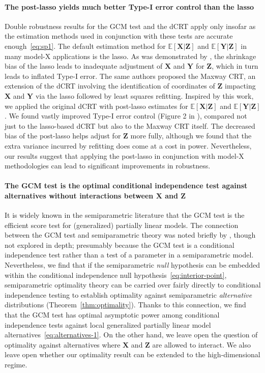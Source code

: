 \documentclass[aos]{imsart}
\theoremstyle{plain}
\theoremstyle{remark}
\newcommand{\E}{\mathbb E}								%
\newcommand{\prx}{\bm X}								%
\newcommand{\prz}{\bm Z}								%
\newcommand{\pry}{{\bm Y}}								%
\begin{document}
\paragraph*{The post-lasso yields much better Type-I error control than the lasso}

Double robustness results for the GCM test and the dCRT apply only insofar as the estimation methods used in conjunction with these tests are accurate enough~\eqref{eq:sp1}. The default estimation method for $\E[\prx|\prz]$ and $\E[\pry|\prz]$ in many model-X applications is the lasso. As was demonstrated by \cite{Li2022}, the shrinkage bias of the lasso leads to inadequate adjustment of $\prx$ and $\pry$ for $\prz$, which in turn leads to inflated Type-I error. The same authors proposed the Maxway CRT, an extension of the dCRT involving the identification of coordinates of $\prz$ impacting $\prx$ and $\pry$ via the lasso followed by least squares refitting. Inspired by this work, we applied the original dCRT with post-lasso estimates for $\E[\prx|\prz]$ and $\E[\pry|\prz]$. We found vastly improved Type-I error control (Figure 2 in \cite{supplementary}), compared not just to the lasso-based dCRT but also to the Maxway CRT itself. The decreased bias of the post-lasso helps adjust for $\prz$ more fully, although we found that the extra variance incurred by refitting does come at a cost in power. Nevertheless, our results suggest that applying the post-lasso in conjunction with model-X methodologies can lead to significant improvements in robustness.

\paragraph*{The GCM test is the optimal conditional independence test against alternatives without interactions between $\prx$ and $\prz$} 

It is widely known in the semiparametric literature that the GCM test is the efficient score test for (generalized) partially linear models. The connection between the GCM test and semiparametric theory was noted briefly by \citet{Shah2018}, though not explored in depth; presumably because the GCM test is a conditional independence test rather than a test of a parameter in a semiparametric model. Nevertheless, we find that if the semiparametric \textit{null} hypothesis can be embedded within the conditional independence null hypothesis~\eqref{eq:interior-point}, semiparametric optimality theory can be carried over fairly directly to conditional independence testing to establish optimality against semiparametric \textit{alternative} distributions (Theorem~\ref{thm:optimality}). Thanks to this connection, we find that the GCM test has optimal asymptotic power among conditional independence tests against local generalized partially linear model alternatives~\eqref{eq:alternatives-1}. On the other hand, we leave open the question of optimality against alternatives where $\prx$ and $\prz$ are allowed to interact. We also leave open whether our optimality result can be extended to the high-dimensional regime.
\end{document}
